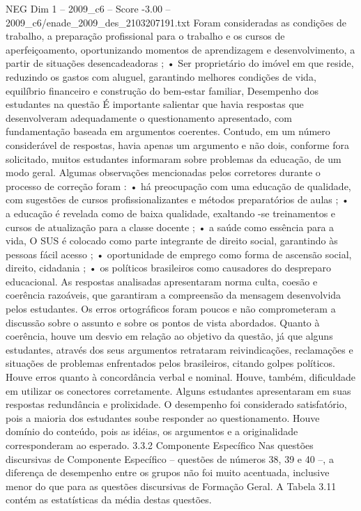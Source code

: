 \begin{textsample}{NEG Dim 1 – 2009\_c6 – Score -3.00 – 2009\_c6/enade\_2009\_des\_2103207191.txt}
Foram consideradas as condições de trabalho, a preparação profissional para o trabalho e os cursos de aperfeiçoamento, oportunizando momentos de aprendizagem e desenvolvimento, a partir de situações desencadeadoras ; • Ser proprietário do imóvel em que reside, reduzindo os gastos com aluguel, garantindo melhores condições de vida, equilíbrio financeiro e construção do bem-estar familiar, Desempenho dos estudantes na questão É importante salientar que havia respostas que desenvolveram adequadamente o questionamento apresentado, com fundamentação baseada em argumentos coerentes.
Contudo, em um número considerável de respostas, havia apenas um argumento e não dois, conforme fora solicitado, muitos estudantes informaram sobre problemas da educação, de um modo geral.
Algumas observações mencionadas pelos corretores durante o processo de correção foram : • há preocupação com uma educação de qualidade, com sugestões de cursos profissionalizantes e métodos preparatórios de aulas ; • a educação é revelada como de baixa qualidade, exaltando -se treinamentos e cursos de atualização para a classe docente ; • a saúde como essência para a vida, O SUS é colocado como parte integrante de direito social, garantindo às pessoas fácil acesso ; • oportunidade de emprego como forma de ascensão social, direito, cidadania ; • os políticos brasileiros como causadores do despreparo educacional.
As respostas analisadas apresentaram norma culta, coesão e coerência razoáveis, que garantiram a compreensão da mensagem desenvolvida pelos estudantes.
Os erros ortográficos foram poucos e não comprometeram a discussão sobre o assunto e sobre os pontos de vista abordados.
Quanto à coerência, houve um desvio em relação ao objetivo da questão, já que alguns estudantes, através dos seus argumentos retrataram reivindicações, reclamações e situações de problemas enfrentados pelos brasileiros, citando golpes políticos.
Houve erros quanto à concordância verbal e nominal.
Houve, também, dificuldade em utilizar os conectores corretamente.
Alguns estudantes apresentaram em suas respostas redundância e prolixidade.
O desempenho foi considerado satisfatório, pois a maioria dos estudantes soube responder ao questionamento.
Houve domínio do conteúdo, pois as idéias, os argumentos e a originalidade corresponderam ao esperado. 3.3.2 Componente Específico Nas questões discursivas de Componente Específico – questões de números 38, 39 e 40 –, a diferença de desempenho entre os grupos não foi muito acentuada, inclusive menor do que para as questões discursivas de Formação Geral.
A Tabela 3.11 contém as estatísticas da média destas questões.

\end{textsample}
